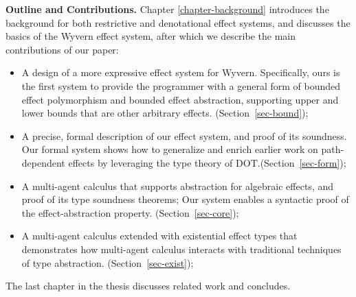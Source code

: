 \noindent\textbf{Outline and Contributions.}  
Chapter \ref{chapter-background} introduces the background for both restrictive and denotational effect systems, and discusses the basics of the Wyvern effect system, after which we describe the main contributions of our paper:
\begin{itemize}
\item A design of a more expressive effect system for Wyvern. Specifically, ours is the first system to provide the programmer with a general form of bounded effect polymorphism and bounded effect abstraction, supporting upper and lower bounds that are other arbitrary effects.  (Section~\ref{sec-bound});
\item A precise, formal description of our effect system, and proof of its soundness.  Our formal system shows how to generalize and enrich earlier work on path-dependent effects by leveraging the type theory of DOT.(Section~\ref{sec-form});
\item A multi-agent calculus  that supports abstraction for algebraic effects, and proof of its type soundness theorems;  Our system enables a syntactic proof of the effect-abstraction property. (Section~\ref{sec-core});
\item A multi-agent calculus extended with existential effect types that demonstrates how multi-agent calculus interacts with traditional techniques of type abstraction. (Section~\ref{sec-exist});
\end{itemize}
The last chapter in the thesis discusses related work and concludes.
